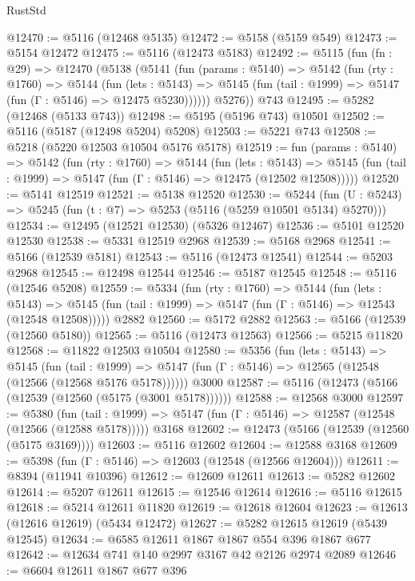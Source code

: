 \begin{lexlean}{RustStd}
\begin{coremodule}
@12470 := @5116 (@12468 @5135)
@12472 := @5158 (@5159 @549)
@12473 := @5154 @12472
@12475 := @5116 (@12473 @5183)
@12492 := @5115
    (fun (fn : @29) =>
    @12470
      (@5138
        (@5141
          (fun (params : @5140) =>
          @5142
            (fun (rty : @1760) =>
            @5144
              (fun (lets : @5143) =>
              @5145 (fun (tail : @1999) => @5147 (fun (Γ : @5146) => @12475 @5230))))))
        @5276))
    @743
@12495 := @5282 (@12468 (@5133 @743))
@12498 := @5195 (@5196 @743) @10501
@12502 := @5116 (@5187 (@12498 @5204) @5208)
@12503 := @5221 @743
@12508 := @5218 (@5220 @12503 @10504 @5176 @5178)
@12519 := fun (params : @5140) =>
  @5142
    (fun (rty : @1760) =>
    @5144
      (fun (lets : @5143) =>
      @5145 (fun (tail : @1999) => @5147 (fun (Γ : @5146) => @12475 (@12502 @12508)))))
@12520 := @5141 @12519
@12521 := @5138 @12520
@12530 := @5244
    (fun (U : @5243) => @5245 (fun (t : @7) => @5253 (@5116 (@5259 @10501 @5134) @5270)))
@12534 := @12495 (@12521 @12530) (@5326 @12467)
@12536 := @5101 @12520 @12530
@12538 := @5331 @12519 @2968
@12539 := @5168 @2968
@12541 := @5166 (@12539 @5181)
@12543 := @5116 (@12473 @12541)
@12544 := @5203 @2968
@12545 := @12498 @12544
@12546 := @5187 @12545
@12548 := @5116 (@12546 @5208)
@12559 := @5334
    (fun (rty : @1760) =>
    @5144
      (fun (lets : @5143) =>
      @5145 (fun (tail : @1999) => @5147 (fun (Γ : @5146) => @12543 (@12548 @12508)))))
    @2882
@12560 := @5172 @2882
@12563 := @5166 (@12539 (@12560 @5180))
@12565 := @5116 (@12473 @12563)
@12566 := @5215 @11820
@12568 := @11822 @12503 @10504
@12580 := @5356
    (fun (lets : @5143) =>
    @5145
      (fun (tail : @1999) =>
      @5147 (fun (Γ : @5146) => @12565 (@12548 (@12566 (@12568 @5176 @5178))))))
    @3000
@12587 := @5116 (@12473 (@5166 (@12539 (@12560 (@5175 (@3001 @5178))))))
@12588 := @12568 @3000
@12597 := @5380
    (fun (tail : @1999) => @5147 (fun (Γ : @5146) => @12587 (@12548 (@12566 (@12588 @5178)))))
    @3168
@12602 := @12473 (@5166 (@12539 (@12560 (@5175 @3169))))
@12603 := @5116 @12602
@12604 := @12588 @3168
@12609 := @5398 (fun (Γ : @5146) => @12603 (@12548 (@12566 @12604)))
@12611 := @8394 (@11941 @10396)
@12612 := @12609 @12611
@12613 := @5282 @12602
@12614 := @5207 @12611
@12615 := @12546 @12614
@12616 := @5116 @12615
@12618 := @5214 @12611 @11820
@12619 := @12618 @12604
@12623 := @12613 (@12616 @12619) (@5434 @12472)
@12627 := @5282 @12615 @12619 (@5439 @12545)
@12634 := @6585 @12611 @1867 @1867 @554 @396 @1867 @677
@12642 := @12634 @741 @140 @2997 @3167 @42 @2126 @2974 @2089
@12646 := @6604 @12611 @1867 @677 @396

\end{coremodule}
\end{lexlean}
